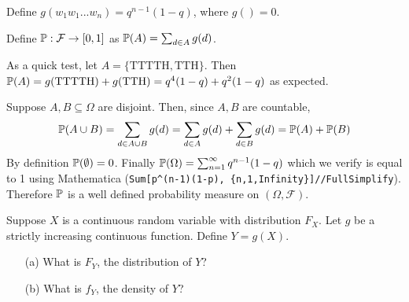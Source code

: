 \documentclass[10pt]{article}
\begin{document}
\begin{solution}[Solution]
\begin{enumerate}
        Define \( g(w_1w_1...w_n) = q^{n-1}(1-q) \), where \( g()=0 \).

        Define \( \mathbb{P}:\mathcal{F}\to[0,1] \) as \( \mathbb{P}(A) = \sum_{d\in A}g(d) \).

        As a quick test, let \( A=\{\text{TTTTH},\text{TTH}\} \). Then \( \mathbb{P}(A) = g(\text{TTTTH})+g(\text{TTH}) = q^4(1-q)+q^2(1-q) \) as expected.

        Suppose \( A,B\subseteq\Omega \) are disjoint. Then, since \( A,B \) are countable,
        \[ \mathbb{P}(A\cup B) = \sum_{d\in A\cup B}g(d) = \sum_{d\in A} g(d) + \sum_{d\in B} g(d) = \mathbb{P}(A)+\mathbb{P}(B) \]
        By definition \( \mathbb{P}(\emptyset) = 0 \). Finally \( \mathbb{P}(\Omega) = \sum_{n=1}^\infty q^{n-1}(1-q)  \) which we verify is equal to 1 using Mathematica (\verb|Sum[p^(n-1)(1-p), {n,1,Infinity}]//FullSimplify|). Therefore \( \mathbb{P} \) is a well defined probability measure on \( (\Omega, \mathcal{F}) \).
        
\end{enumerate}
\end{solution}


\begin{problem}[Exercise 1.4]
Suppose \( X \) is a continuous random variable with distribution \( F_X \). Let \( g \) be a strictly increasing continuous function. Define \( Y=g(X) \). 
\begin{enumerate}
	\item[(a)] What is \( F_Y \), the distribution of \( Y \)?
	\item[(b)] What is \( f_Y \), the density of \( Y \)?
\end{enumerate}
\end{problem}
\end{document}
